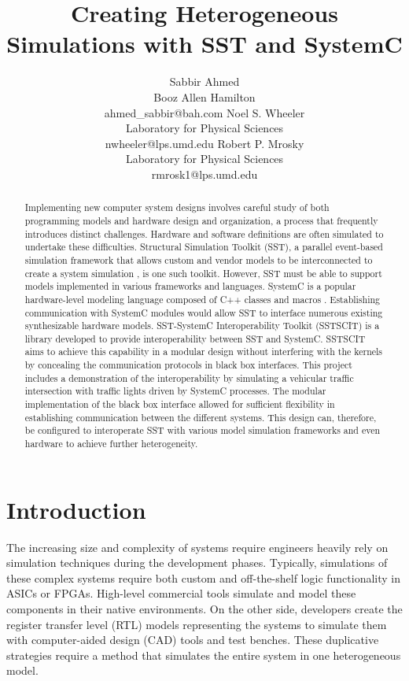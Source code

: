 \documentclass{article}
\title{Creating Heterogeneous Simulations with SST and SystemC}
\author{
  Sabbir Ahmed \\
  Booz Allen Hamilton \\
  ahmed\_sabbir@bah.com
  \And
  Noel S. Wheeler \\
  Laboratory for Physical Sciences \\
  nwheeler@lps.umd.edu
  \And
  Robert P. Mrosky \\
  Laboratory for Physical Sciences \\
  rmrosk1@lps.umd.edu
}
\begin{document}
  \maketitle

  \begin{abstract}
    Implementing new computer system designs involves careful study of both programming models and
    hardware design and organization, a process that frequently introduces distinct challenges.
    Hardware and software definitions are often simulated to undertake these difficulties.
    Structural Simulation Toolkit (SST), a parallel event-based simulation framework that allows
    custom and vendor models to be interconnected to create a system simulation \cite{sst}, is one
    such toolkit. However, SST must be able to support models implemented in various frameworks and
    languages. SystemC is a popular hardware-level modeling language composed of C++ classes and
    macros \cite{sysc}. Establishing communication with SystemC modules would allow SST to interface
    numerous existing synthesizable hardware models. SST-SystemC Interoperability Toolkit (SSTSCIT)
    is a library developed to provide interoperability between SST and SystemC. SSTSCIT aims to
    achieve this capability in a modular design without interfering with the kernels by concealing
    the communication protocols in black box interfaces. This project includes a demonstration of
    the interoperability by simulating a vehicular traffic intersection with traffic lights driven
    by SystemC processes. The modular implementation of the black box interface allowed for
    sufficient flexibility in establishing communication between the different systems. This design
    can, therefore, be configured to interoperate SST with various model simulation frameworks and
    even hardware to achieve further heterogeneity.
  \end{abstract}

  \section{Introduction}  
  The increasing size and complexity of systems require engineers heavily rely on simulation
  techniques during the development phases. Typically, simulations of these complex systems require
  both custom and off-the-shelf logic functionality in ASICs or FPGAs. High-level commercial tools
  simulate and model these components in their native environments. On the other side, developers
  create the register transfer level (RTL) models representing the systems to simulate them with
  computer-aided design (CAD) tools and test benches. These duplicative strategies require a method
  that simulates the entire system in one heterogeneous model.
\end{document}
